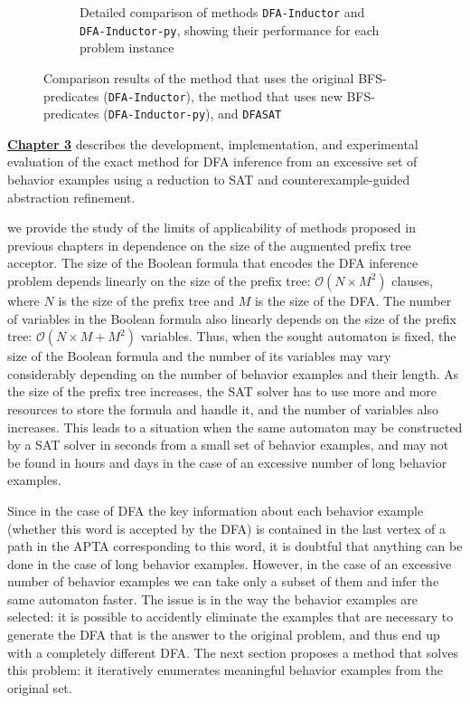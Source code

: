 \begin{figure}[ht]
\begin{subfigure}[b]{0.48\textwidth}
    \caption{Detailed comparison of methods \texttt{DFA-Inductor} and \texttt{DFA-Inductor-py}, showing their performance for each problem instance}
    \label{syn-en:img:plots:scatter}
  \end{subfigure}
  \caption{Comparison results of the method that uses the original BFS-predicates (\texttt{DFA-Inductor}), the method that uses new BFS-predicates (\texttt{DFA-Inductor-py}), and \texttt{DFASAT}}
  \label{syn-en:img:plots}
\end{figure}


\textbf{\underline{Chapter 3}} describes the development, implementation, and experimental evaluation of the exact method for DFA inference from an excessive set of behavior
examples using a reduction to SAT and counterexample-guided abstraction refinement.

\insectionen{\ref{sec:cegar:motivation}} we provide the study of the limits of applicability of methods proposed in previous chapters in dependence on the size of the augmented
prefix tree acceptor.
The size of the Boolean formula that encodes the DFA inference problem depends linearly on the size of the prefix tree:
$\mathcal{O}\left(N \times M^{2}\right)$ clauses, where $N$ is the size of the prefix tree and $M$ is the size of the DFA.
The number of variables in the Boolean formula also linearly depends on the size of the prefix tree: $\mathcal{O}\left(N \times M + M^{2}\right)$ variables.
Thus, when the sought automaton is fixed, the size of the Boolean formula and the number of its variables may vary considerably depending on the number of behavior examples and
their length.
As the size of the prefix tree increases, the SAT solver has to use more and more resources to store the formula and handle it, and the number of variables also increases.
This leads to a situation when the same automaton may be constructed by a SAT solver in seconds from a small set of behavior examples, and may not be found in hours and days in 
the case of an excessive number of long behavior examples.

Since in the case of DFA the key information about each behavior example (whether this word is accepted by the DFA) is contained in the last vertex of a path in the APTA corresponding to this word, it is doubtful that anything can be done in the case of long behavior examples.
However, in the case of an excessive number of behavior examples we can take only a subset of them and infer the same automaton faster.
The issue is in the way the behavior examples are selected: it is possible to accidently eliminate the examples that are necessary to generate the DFA that is the answer to the original problem,
and thus end up with a completely different DFA.
The next section proposes a method that solves this problem: it iteratively enumerates meaningful behavior examples from the original set.

